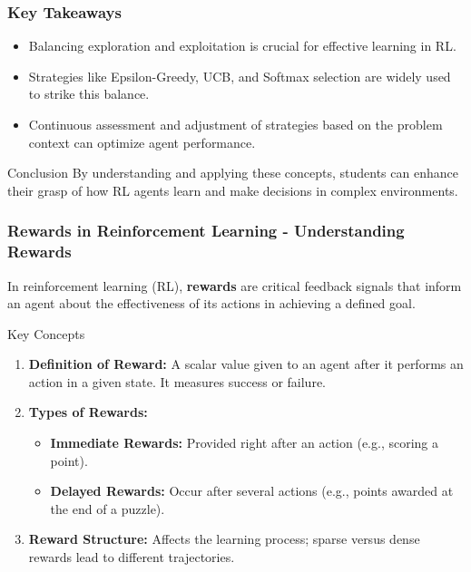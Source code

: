 \documentclass[aspectratio=169]{beamer}
\begin{document}
\begin{frame}[fragile]
    \frametitle{Key Takeaways}
    \begin{itemize}
        \item Balancing exploration and exploitation is crucial for effective learning in RL.
        \item Strategies like Epsilon-Greedy, UCB, and Softmax selection are widely used to strike this balance.
        \item Continuous assessment and adjustment of strategies based on the problem context can optimize agent performance.
    \end{itemize}
    \begin{block}{Conclusion}
        By understanding and applying these concepts, students can enhance their grasp of how RL agents learn and make decisions in complex environments.
    \end{block}
\end{frame}

\begin{frame}[fragile]
    \frametitle{Rewards in Reinforcement Learning - Understanding Rewards}
    In reinforcement learning (RL), \textbf{rewards} are critical feedback signals that inform an agent about the effectiveness of its actions in achieving a defined goal.
    
    \begin{block}{Key Concepts}
        \begin{enumerate}
            \item \textbf{Definition of Reward:} A scalar value given to an agent after it performs an action in a given state. It measures success or failure.
            \item \textbf{Types of Rewards:}
            \begin{itemize}
                \item \textbf{Immediate Rewards:} Provided right after an action (e.g., scoring a point).
                \item \textbf{Delayed Rewards:} Occur after several actions (e.g., points awarded at the end of a puzzle).
            \end{itemize}
            \item \textbf{Reward Structure:} Affects the learning process; sparse versus dense rewards lead to different trajectories.
        \end{enumerate}
    \end{block}
\end{frame}
\end{document}
